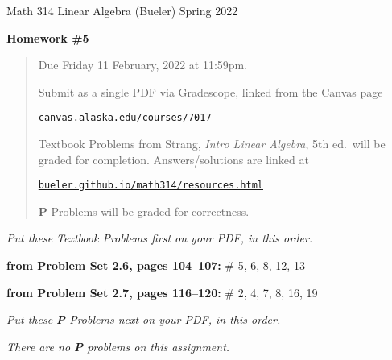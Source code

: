 \documentclass[12pt]{amsart}
\newcommand{\prob}[1]{\bigskip\noindent\textbf{#1}\quad }
\newcommand{\probset}[2]{\prob{from Problem Set #1, pages #2:}}
\begin{document}
\scriptsize \noindent Math 314 Linear Algebra (Bueler) \hfill Spring 2022
\normalsize\medskip

\Large
\centerline{\textbf{Homework \#5}}

\normalsize
\bigskip
\begin{quote}
Due Friday 11 February, 2022 at 11:59pm.

\medskip
\noindent Submit as a single PDF via Gradescope, linked from the Canvas page

\href{https://canvas.alaska.edu/courses/7017}{\texttt{canvas.alaska.edu/courses/7017}}

\noindent Textbook Problems from Strang, \emph{Intro Linear Algebra}, 5th ed.~will be graded for completion.  Answers/solutions are linked at

\href{https://bueler.github.io/math314/resources.html}{\texttt{bueler.github.io/math314/resources.html}}

\noindent \textbf{P} Problems will be graded for correctness.
\end{quote}
\medskip

\thispagestyle{empty}

\noindent \hrulefill

\noindent \emph{Put these Textbook Problems first on your PDF, in this order.}

\probset{2.6}{104--107} \# 5, 6, 8, 12, 13

\probset{2.7}{116--120} \# 2, 4, 7, 8, 16, 19


\bigskip
\noindent \hrulefill

\noindent \emph{Put these \textbf{P} Problems next on your PDF, in this order.}


\bigskip
\begin{center}
\emph{There are no \textbf{P} problems on this assignment.}
\end{center}
\end{document}
